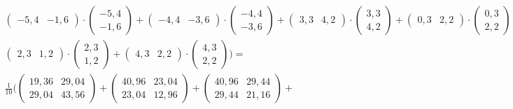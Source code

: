 \documentclass[a4paper,parskip=full-]{article}
\begin{document}
\begin{multline*}
\begin{pmatrix} -5,4 &  -1,6 \end{pmatrix} \cdot
\begin{pmatrix} -5,4 \\ -1,6 \end{pmatrix} +
\begin{pmatrix} -4,4 &  -3,6 \end{pmatrix} \cdot
\begin{pmatrix} -4,4 \\ -3,6 \end{pmatrix} +
\begin{pmatrix} 3,3 &  4,2 \end{pmatrix} \cdot
\begin{pmatrix} 3,3 \\ 4,2 \end{pmatrix} +
\begin{pmatrix} 0,3 &  2,2 \end{pmatrix} \cdot
\begin{pmatrix} 0,3 \\ 2,2 \end{pmatrix} +
\begin{pmatrix} 3,3 &  -0,8 \end{pmatrix} \cdot
\begin{pmatrix} 3,3 \\ -0,8 \end{pmatrix} + \\
\begin{pmatrix} 2,3 &  1,2 \end{pmatrix} \cdot
\begin{pmatrix} 2,3 \\ 1,2 \end{pmatrix} +
\begin{pmatrix} 4,3 &  2,2 \end{pmatrix} \cdot
\begin{pmatrix} 4,3 \\ 2,2 \end{pmatrix}  
\Biggr) = \\ \frac{1}{10} \Biggl(
\begin{pmatrix} 19,36 & 29,04 \\ 29,04 & 43,56 \end{pmatrix} +
\begin{pmatrix} 40,96 & 23,04 \\ 23,04 & 12,96 \end{pmatrix} +
\begin{pmatrix} 40,96 & 29,44 \\ 29,44 & 21,16 \end{pmatrix} +

\end{multline*}
\end{document}
